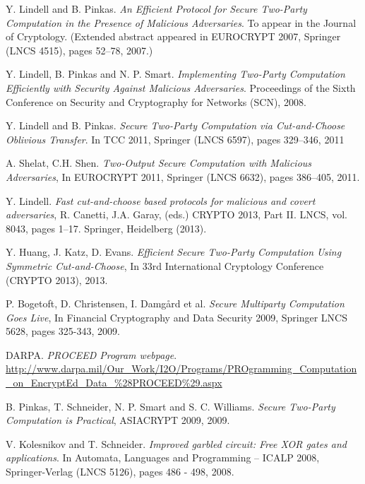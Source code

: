 \documentclass[ %
                    author={Nicholas Tutte},
                supervisor={Prof. Nigel Smart},
                    degree={MEng},
                     title={Secure Two Party Computation},
                  subtitle={A practical comparison of recent protocols},
                      type={Research - GG1K},
                      year={2015} ]{dissertation}
\begin{document}
	\begin{thebibliography}{99}

			Y. Lindell and B. Pinkas. \emph{An Efficient Protocol for Secure Two-Party Computation in the Presence of Malicious Adversaries}.
			To appear in the Journal of Cryptology. (Extended abstract appeared in EUROCRYPT 2007, Springer (LNCS 4515), pages 52–78, 2007.)

			Y. Lindell, B. Pinkas and N. P. Smart.
			\emph{Implementing Two-Party Computation Efficiently with Security Against Malicious Adversaries}. Proceedings of the Sixth Conference on Security and Cryptography for Networks (SCN),
			2008.

			Y. Lindell and B. Pinkas. \emph{Secure Two-Party Computation via Cut-and-Choose Oblivious Transfer}.
			In TCC 2011,
			Springer (LNCS 6597), pages 329–346,
			2011

			A. Shelat, C.H. Shen. \emph{Two-Output Secure Computation with Malicious Adversaries},
			In EUROCRYPT 2011,
			Springer (LNCS 6632), pages 386–405,
			2011.

			Y. Lindell.
			\emph{Fast cut-and-choose based protocols for malicious and covert adversaries}, R. Canetti, J.A. Garay, (eds.)
			CRYPTO 2013, Part II. LNCS, vol. 8043, pages 1–17.
			Springer, Heidelberg (2013).

			Y. Huang, J. Katz, D. Evans.
			\emph{Efficient Secure Two-Party Computation Using Symmetric Cut-and-Choose}, In 33rd International Cryptology Conference (CRYPTO 2013),
			2013.

			P. Bogetoft, D. Christensen, I. Damgård et al.
			\emph{Secure Multiparty Computation Goes Live},
			In Financial Cryptography and Data Security 2009,
			Springer LNCS 5628, pages 325-343,
			2009.

			DARPA.
			\emph{PROCEED Program webpage}.
			\url{http://www.darpa.mil/Our_Work/I2O/Programs/PROgramming_Computation_on_EncryptEd_Data_%28PROCEED%29.aspx}

			
			B. Pinkas, T. Schneider, N. P. Smart and S. C. Williams.
			\emph{Secure Two-Party Computation is Practical},
			ASIACRYPT 2009, 2009.

			V. Kolesnikov and T. Schneider.
			\emph{Improved garbled circuit: Free XOR gates and applications}.
			In Automata, Languages and Programming – ICALP 2008, Springer-Verlag (LNCS 5126),
			pages 486 - 498,
			2008.


\end{thebibliography}
\end{document}
